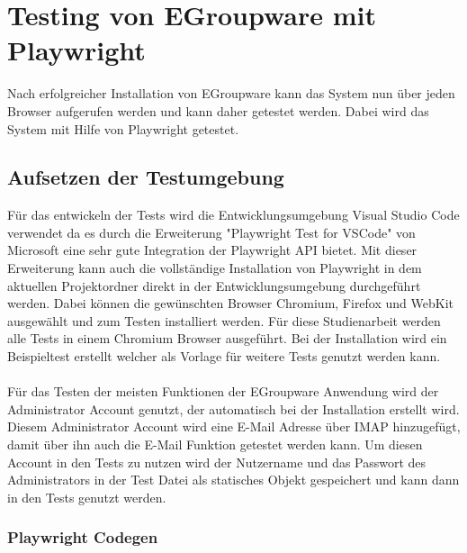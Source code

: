 \chapter{Testing von EGroupware mit Playwright}

Nach erfolgreicher Installation von EGroupware kann das System nun über jeden Browser aufgerufen werden und kann daher getestet werden.
Dabei wird das System mit Hilfe von Playwright getestet.

\section{Aufsetzen der Testumgebung}

Für das entwickeln der Tests wird die Entwicklungsumgebung Visual Studio Code verwendet da es durch die Erweiterung "Playwright Test for VSCode" von Microsoft eine sehr gute Integration der Playwright API bietet.
Mit dieser Erweiterung kann auch die vollständige Installation von Playwright in dem aktuellen Projektordner direkt in der Entwicklungsumgebung durchgeführt werden.
Dabei können die gewünschten Browser Chromium, Firefox und WebKit ausgewählt und zum Testen installiert werden.
Für diese Studienarbeit werden alle Tests in einem Chromium Browser ausgeführt.
Bei der Installation wird ein Beispieltest erstellt welcher als Vorlage für weitere Tests genutzt werden kann.
\\
\\
Für das Testen der meisten Funktionen der EGroupware Anwendung wird der Administrator Account genutzt, der automatisch bei der Installation erstellt wird.
Diesem Administrator Account wird eine E-Mail Adresse über IMAP hinzugefügt, damit über ihn auch die E-Mail Funktion getestet werden kann.
Um diesen Account in den Tests zu nutzen wird der Nutzername und das Passwort des Administrators in der Test Datei als statisches Objekt gespeichert und kann dann in den Tests genutzt werden.

\subsection{Playwright Codegen}

